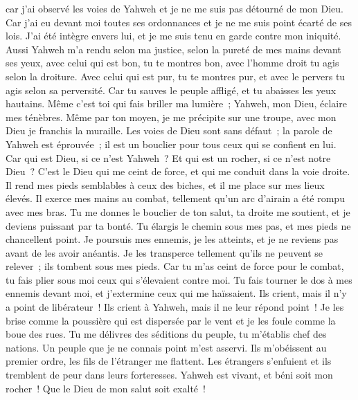 \begin{multicols}{2}
car j'ai observé les voies de Yahweh et je ne me suis pas détourné de mon Dieu.
Car j'ai eu devant moi toutes ses ordonnances et je ne me suis point écarté de ses lois.
J'ai été intègre envers lui, et je me suis tenu en garde contre mon iniquité.
Aussi Yahweh m'a rendu selon ma justice, selon la pureté de mes mains devant ses yeux,
avec celui qui est bon, tu te montres bon, avec l'homme droit tu agis selon la droiture.
Avec celui qui est pur, tu te montres pur, et avec le pervers tu agis selon sa perversité.
Car tu sauves le peuple affligé, et tu abaisses les yeux hautains.
Même c'est toi qui fais briller ma lumière~; Yahweh, mon Dieu, éclaire mes ténèbres.
Même par ton moyen, je me précipite sur une troupe, avec mon Dieu je franchis la muraille.
Les voies de Dieu sont sans défaut~; la parole de Yahweh est éprouvée~; il est un bouclier pour tous ceux qui se confient en lui.
Car qui est Dieu, si ce n'est Yahweh~? Et qui est un rocher, si ce n'est notre Dieu~?
C'est le Dieu qui me ceint de force, et qui me conduit dans la voie droite.
Il rend mes pieds semblables à ceux des biches, et il me place sur mes lieux élevés.
Il exerce mes mains au combat, tellement qu'un arc d'airain a été rompu avec mes bras.
Tu me donnes le bouclier de ton salut, ta droite me soutient, et je deviens puissant par ta bonté.
Tu élargis le chemin sous mes pas, et mes pieds ne chancellent point.
Je poursuis mes ennemis, je les atteints, et je ne reviens pas avant de les avoir anéantis.
Je les transperce tellement qu'ils ne peuvent se relever~; ils tombent sous mes pieds.
Car tu m'as ceint de force pour le combat, tu fais plier sous moi ceux qui s'élevaient contre moi.
Tu fais tourner le dos à mes ennemis devant moi, et j'extermine ceux qui me haïssaient.
Ils crient, mais il n'y a point de libérateur~! Ils crient à Yahweh, mais il ne leur répond point~!
Je les brise comme la poussière qui est dispersée par le vent et je les foule comme la boue des rues.
Tu me délivres des séditions du peuple, tu m'établis chef des nations. Un peuple que je ne connais point m'est asservi.
Ils m'obéissent au premier ordre, les fils de l'étranger me flattent.
Les étrangers s'enfuient et ils tremblent de peur dans leurs forteresses.
Yahweh est vivant, et béni soit mon rocher~! Que le Dieu de mon salut soit exalté~!

\end{multicols}
